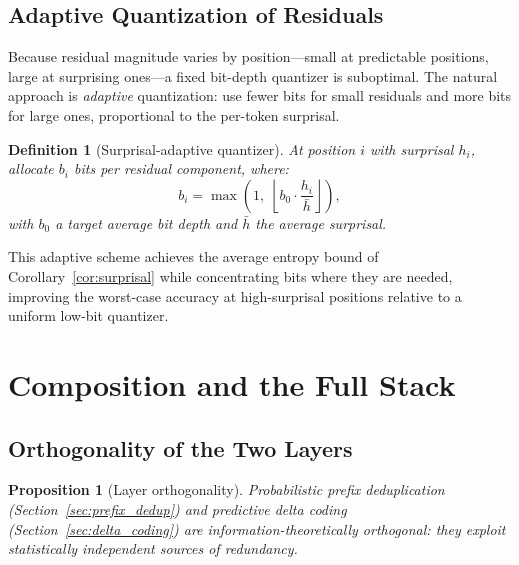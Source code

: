 \documentclass[11pt]{article}
\newtheorem{definition}{Definition}
\newtheorem{proposition}{Proposition}
\begin{document}
\subsection{Adaptive Quantization of Residuals}

Because residual magnitude varies by position---small at predictable positions,
large at surprising ones---a fixed bit-depth quantizer is suboptimal.  The
natural approach is \emph{adaptive} quantization: use fewer bits for small
residuals and more bits for large ones, proportional to the per-token surprisal.

\begin{definition}[Surprisal-adaptive quantizer]
\label{def:adaptive_quant}
At position $i$ with surprisal $h_i$, allocate $b_i$ bits per residual component,
where:
\[
  b_i = \max\!\left(1,\; \left\lfloor b_0 \cdot \frac{h_i}{\bar{h}} \right\rfloor \right),
\]
with $b_0$ a target average bit depth and $\bar{h}$ the average surprisal.
\end{definition}

This adaptive scheme achieves the average entropy bound of Corollary~\ref{cor:surprisal}
while concentrating bits where they are needed, improving the worst-case accuracy
at high-surprisal positions relative to a uniform low-bit quantizer.

\section{Composition and the Full Stack}
\label{sec:compose}

\subsection{Orthogonality of the Two Layers}

\begin{proposition}[Layer orthogonality]
\label{prop:orthogonal}
Probabilistic prefix deduplication (Section~\ref{sec:prefix_dedup}) and
predictive delta coding (Section~\ref{sec:delta_coding}) are information-theoretically
orthogonal: they exploit statistically independent sources of redundancy.
\end{proposition}
\end{document}
